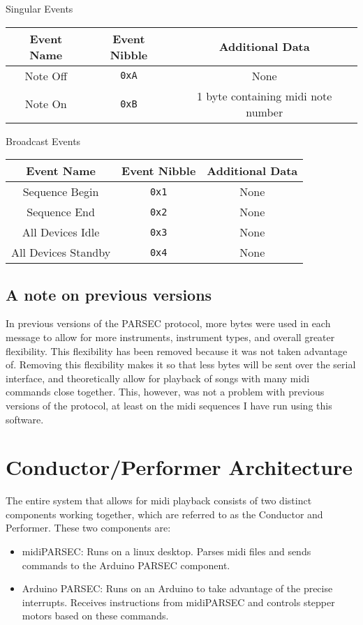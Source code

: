 \documentclass{article}
\begin{document}
\begin{center}
    Singular Events\\
    \begin{tabular}{|c|c|c|}
        \hline Event Name & Event Nibble & Additional Data \\\hline
        Note Off & \verb"0xA" & None\\\hline
        Note On & \verb"0xB" & 1 byte containing midi note number\\\hline
    \end{tabular}
    
    \vphantom{1}
    
    Broadcast Events\\
    \begin{tabular}{|c|c|c|}
        \hline Event Name & Event Nibble & Additional Data \\\hline
        Sequence Begin & \verb"0x1" & None\\\hline
        Sequence End & \verb"0x2" & None\\\hline
        All Devices Idle & \verb"0x3" & None\\\hline
        All Devices Standby & \verb"0x4" & None\\\hline
    \end{tabular}
    
\end{center}

\subsection{A note on previous versions}
\noindent In previous versions of the PARSEC protocol, more bytes were used in each message to allow for more instruments, instrument types, and overall greater flexibility. This flexibility has been removed because it was not taken advantage of. Removing this flexibility makes it so that less bytes will be sent over the serial interface, and theoretically allow for playback of songs with many midi commands close together. This, however, was not a problem with previous versions of the protocol, at least on the midi sequences I have run using this software. 


\section{Conductor/Performer Architecture}
\noindent The entire system that allows for midi playback consists of two distinct components working together, which are referred to as the Conductor and Performer. These two components are: 
\begin{itemize}
    \item midiPARSEC: Runs on a linux desktop. Parses midi files and sends commands to the Arduino PARSEC component.
    \item Arduino PARSEC: Runs on an Arduino to take advantage of the precise interrupts. Receives instructions from midiPARSEC and controls stepper motors based on these commands.
\end{itemize}
\end{document}

